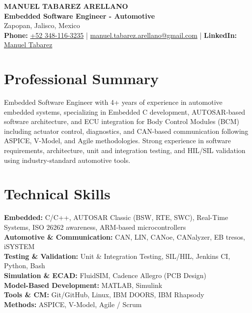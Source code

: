 \documentclass[10pt,a4paper]{article}
\begin{document}
	
\begin{center}
{\Large\textbf{MANUEL TABAREZ ARELLANO}} \\[4pt]
\textbf{Embedded Software Engineer - Automotive} \\[6pt]
Zapopan, Jalisco, Mexico \\
\textbf{Phone:} \href{tel: +523481163235}{+52 348-116-3235} \;|\;
\href{mailto:manuel.tabarez.arellano@gmail.com}{manuel.tabarez.arellano@gmail.com} \;|\;
\textbf{LinkedIn: }\href{https://www.linkedin.com/in/manuel-alejandro-tabarez-arellano}{Manuel Tabarez}

\end{center}
	
\section{Professional Summary}
Embedded Software Engineer with 4+ years of experience in automotive embedded systems, specializing in Embedded C development, AUTOSAR-based software architecture, and ECU integration for Body Control Modules (BCM) including actuator control, diagnostics, and CAN-based communication following ASPICE, V-Model, and Agile methodologies. Strong experience in software requirements, architecture, unit and integration testing, and HIL/SIL validation using industry-standard automotive tools.

\section{Technical Skills}
\small
\textbf{Embedded:} C/C++, AUTOSAR Classic (BSW, RTE, SWC), Real-Time Systems, ISO 26262 awareness, ARM-based microcontrollers \\
\textbf{Automotive \& Communication:} CAN, LIN, CANoe, CANalyzer, EB tresos, iSYSTEM \\
\textbf{Testing \& Validation:} Unit \& Integration Testing, SIL/HIL, Jenkins CI, Python, Bash \\
\textbf{Simulation \& ECAD:} FluidSIM, Cadence Allegro (PCB Design) \\
\textbf{Model-Based Development:} MATLAB, Simulink \\
\textbf{Tools \& CM:} Git/GitHub, Linux, IBM DOORS, IBM Rhapsody \\
\textbf{Methods:} ASPICE, V-Model, Agile / Scrum
\end{document}
